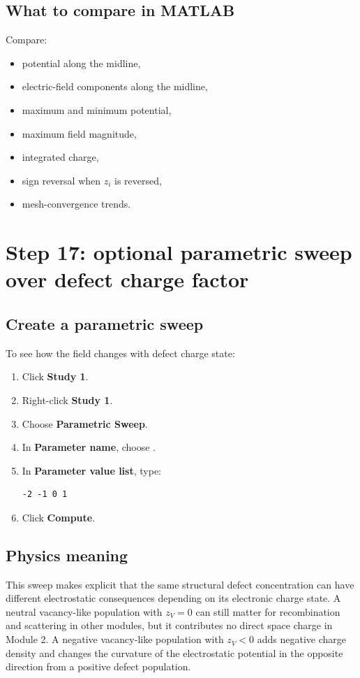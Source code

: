 \documentclass[11pt]{article}
\newcommand{\code}[1]{\texttt{\detokenize{#1}}}
\begin{document}
\subsection{What to compare in MATLAB}

Compare:
\begin{itemize}[leftmargin=2em]
\item potential along the midline,
\item electric-field components along the midline,
\item maximum and minimum potential,
\item maximum field magnitude,
\item integrated charge,
\item sign reversal when $z_i$ is reversed,
\item mesh-convergence trends.
\end{itemize}

\section{Step 17: optional parametric sweep over defect charge factor}

\subsection{Create a parametric sweep}

To see how the field changes with defect charge state:
\begin{enumerate}[leftmargin=2em]
\item Click \textbf{Study 1}.
\item Right-click \textbf{Study 1}.
\item Choose \textbf{Parametric Sweep}.
\item In \textbf{Parameter name}, choose \code{zV}.
\item In \textbf{Parameter value list}, type:
\begin{verbatim}
-2 -1 0 1
\end{verbatim}
\item Click \textbf{Compute}.
\end{enumerate}

\subsection{Physics meaning}

This sweep makes explicit that the same structural defect concentration can have different electrostatic consequences depending on its electronic charge state. A neutral vacancy-like population with $z_V=0$ can still matter for recombination and scattering in other modules, but it contributes no direct space charge in Module 2. A negative vacancy-like population with $z_V<0$ adds negative charge density and changes the curvature of the electrostatic potential in the opposite direction from a positive defect population.
\end{document}

